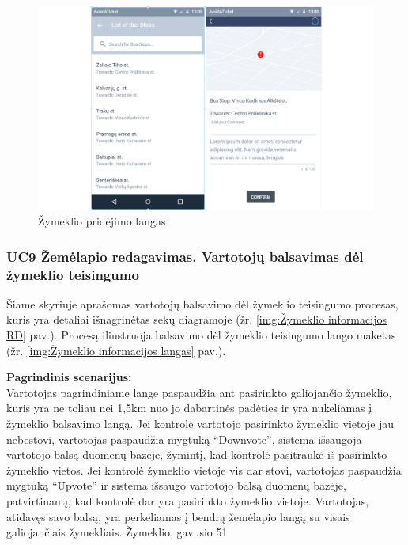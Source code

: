 \documentclass{VUMIFPSkursinis}
\begin{document}
	\begin{figure}[H]
				\centering
				\includegraphics[scale=0.2]{img/mockup_AddMarker}
				\caption{Žymeklio pridėjimo langas}
				\label{img:Žymeklio pridėjimo langas}
			\end{figure}

\subsubsection{UC9 Žemėlapio redagavimas. Vartotojų balsavimas dėl žymeklio teisingumo}
	Šiame skyriuje aprašomas vartotojų balsavimo dėl žymeklio teisingumo procesas,  kuris yra detaliai išnagrinėtas sekų diagramoje (žr. \ref{img:Žymeklio informacijos RD} pav.). 
	Procesą iliustruoja balsavimo dėl žymeklio teisingumo lango maketas (žr. \ref{img:Žymeklio informacijos langas} pav.).

	\textbf{Pagrindinis scenarijus:}\\
	Vartotojas pagrindiniame lange paspaudžia ant pasirinkto galiojančio žymeklio, kuris yra ne toliau nei 1,5km nuo jo dabartinės padėties ir yra nukeliamas į žymeklio balsavimo langą. Jei kontrolė vartotojo pasirinkto žymeklio vietoje jau nebestovi, vartotojas paspaudžia mygtuką “Downvote”, sistema išsaugoja vartotojo balsą duomenų bazėje, žymintį, kad kontrolė pasitraukė iš pasirinkto žymeklio vietos. Jei kontrolė žymeklio vietoje vis dar stovi, vartotojas paspaudžia mygtuką “Upvote” ir sistema išsaugo vartotojo balsą duomenų bazėje, patvirtinantį, kad kontrolė dar yra pasirinkto žymeklio vietoje. Vartotojas, atidavęs savo balsą, yra perkeliamas į bendrą žemėlapio langą su visais galiojančiais žymekliais. Žymeklio, gavusio 51%
	
\end{document}

